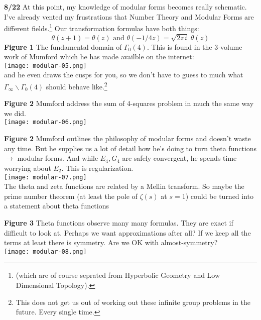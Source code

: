 \documentclass[12pt]{article}
\begin{document}
\newpage

\noindent \textbf{8/22} At this point, my knowledge of modular forms becomes really schematic.  I've already vented my frustrations that Number Theory and Modular Forms are different fields.\footnote{(which are of course seprated from Hyperbolic Geometry and Low Dimensional Topology).}  Our transformation formulas have both things:
$$ \theta(z + 1 ) = \theta(z) \text{ and }\theta(-1/4z) = \sqrt{ 2 z\,i} \;\theta(z) $$
\textbf{Figure 1} The fundamental domain of $\Gamma_0(4)$.  This is found in the 3-volume work of Mumford which he has made availble on the internet:\\
\texttt{[image: modular-05.png]} \\
and he even draws the cusps for you, so we don't have to guess to much what $\Gamma_\infty \backslash \Gamma_0(4)$ should behave like.\footnote{This does not get us out of working out these infinite group problems in the future.  Every single time.}

\newpage

\noindent \textbf{Figure 2} Mumford address the sum of 4-squares problem in much the same way we did.  \\
\texttt{[image: modular-06.png]} \\

\newpage

\noindent \textbf{Figure 2} Mumford outlines the philosophy of modular forms and doesn't waste any time.  But he supplies us a lot of detail how he's doing to turn theta functions $\to$ modular forms.  And while $E_4, G_4$ are safely convergent, he spends time worrying about $E_2$.  This is regularization. \\
\texttt{[image: modular-07.png]} \\
The theta and zeta functions are related by a Mellin transform.  So maybe the prime number theorem (at least the pole of $\zeta(s)$ at $s = 1$) could be turned into a statement about theta functions \\
\newpage

\noindent \textbf{Figure 3}  Theta functions observe many many formulas.  They are exact if difficult to look at.  Perhaps we want approximations after all?  If we keep all the terms at least there is symmetry.  Are we OK with almost-symmetry? \\
\texttt{[image: modular-08.png]} \\

\newpage
\end{document}
